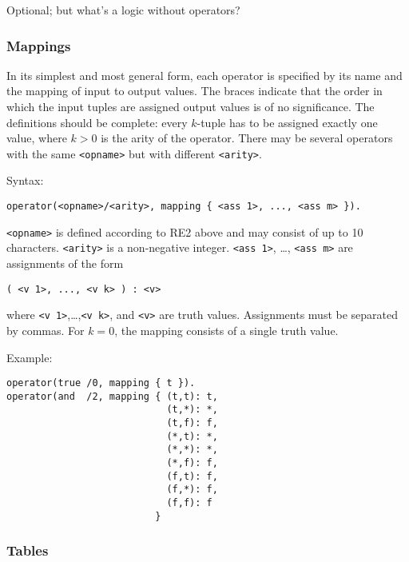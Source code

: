 \documentclass[
]{article}
\newcommand{\passthrough}[1]{#1}
\begin{document}
Optional; but what's a logic without operators?

\hypertarget{mappings}{%
\subsubsection{Mappings}\label{mappings}}

In its simplest and most general form, each operator is specified by its
name and the mapping of input to output values. The braces indicate that
the order in which the input tuples are assigned output values is of no
significance. The definitions should be complete: every \(k\)-tuple has
to be assigned exactly one value, where \(k>0\) is the arity of the
operator. There may be several operators with the same
\passthrough{\lstinline!<opname>!} but with different
\passthrough{\lstinline!<arity>!}.

Syntax:

\begin{lstlisting}
operator(<opname>/<arity>, mapping { <ass 1>, ..., <ass m> }).
\end{lstlisting}

\passthrough{\lstinline!<opname>!} is defined according to RE2 above and
may consist of up to 10 characters. \passthrough{\lstinline!<arity>!} is
a non-negative integer. \passthrough{\lstinline!<ass 1>!}, \ldots,
\passthrough{\lstinline!<ass m>!} are assignments of the form

\begin{lstlisting}
( <v 1>, ..., <v k> ) : <v>
\end{lstlisting}

where
\passthrough{\lstinline!<v 1>!},\ldots,\passthrough{\lstinline!<v k>!},
and \passthrough{\lstinline!<v>!} are truth values. Assignments must be
separated by commas. For \(k = 0\), the mapping consists of a single
truth value.

Example:

\begin{lstlisting}
operator(true /0, mapping { t }).
operator(and  /2, mapping { (t,t): t,
                            (t,*): *,
                            (t,f): f,
                            (*,t): *,
                            (*,*): *,
                            (*,f): f,
                            (f,t): f,
                            (f,*): f,
                            (f,f): f
                          }
\end{lstlisting}

\hypertarget{tables}{%
\subsubsection{Tables}\label{tables}}
\end{document}
